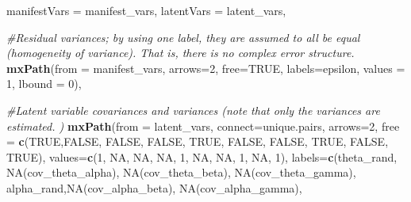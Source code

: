 \documentclass[
12pt, %
twoside,
english]{guelphthesis}
\newenvironment{Shaded}{\begin{snugshade}}{\end{snugshade}}
\newcommand{\AttributeTok}[1]{\textcolor[rgb]{0.13,0.29,0.53}{#1}}
\newcommand{\CommentTok}[1]{\textcolor[rgb]{0.56,0.35,0.01}{\textit{#1}}}
\newcommand{\ConstantTok}[1]{\textcolor[rgb]{0.56,0.35,0.01}{#1}}
\newcommand{\DecValTok}[1]{\textcolor[rgb]{0.00,0.00,0.81}{#1}}
\newcommand{\FunctionTok}[1]{\textcolor[rgb]{0.13,0.29,0.53}{\textbf{#1}}}
\newcommand{\NormalTok}[1]{#1}
\newcommand{\StringTok}[1]{\textcolor[rgb]{0.31,0.60,0.02}{#1}}
\begin{document}
\begin{Shaded}
\begin{Highlighting}[numbers=left,,]
  \AttributeTok{manifestVars =}\NormalTok{ manifest\_vars,}
  \AttributeTok{latentVars =}\NormalTok{ latent\_vars,}
  
  \CommentTok{\#Residual variances; by using one label, they are assumed to all be equal (homogeneity of variance). That is, there is no complex error structure. }
  \FunctionTok{mxPath}\NormalTok{(}\AttributeTok{from =}\NormalTok{ manifest\_vars,}
         \AttributeTok{arrows=}\DecValTok{2}\NormalTok{, }\AttributeTok{free=}\ConstantTok{TRUE}\NormalTok{,  }\AttributeTok{labels=}\StringTok{\textquotesingle{}epsilon\textquotesingle{}}\NormalTok{, }\AttributeTok{values =} \DecValTok{1}\NormalTok{, }\AttributeTok{lbound =} \DecValTok{0}\NormalTok{),}
  
  \CommentTok{\#Latent variable covariances and variances (note that only the variances are estimated. )}
  \FunctionTok{mxPath}\NormalTok{(}\AttributeTok{from =}\NormalTok{ latent\_vars,}
         \AttributeTok{connect=}\StringTok{\textquotesingle{}unique.pairs\textquotesingle{}}\NormalTok{, }\AttributeTok{arrows=}\DecValTok{2}\NormalTok{,}
         \AttributeTok{free =} \FunctionTok{c}\NormalTok{(}\ConstantTok{TRUE}\NormalTok{,}\ConstantTok{FALSE}\NormalTok{, }\ConstantTok{FALSE}\NormalTok{, }\ConstantTok{FALSE}\NormalTok{, }
                  \ConstantTok{TRUE}\NormalTok{, }\ConstantTok{FALSE}\NormalTok{, }\ConstantTok{FALSE}\NormalTok{, }
                  \ConstantTok{TRUE}\NormalTok{, }\ConstantTok{FALSE}\NormalTok{, }
                  \ConstantTok{TRUE}\NormalTok{), }
         \AttributeTok{values=}\FunctionTok{c}\NormalTok{(}\DecValTok{1}\NormalTok{, }\ConstantTok{NA}\NormalTok{, }\ConstantTok{NA}\NormalTok{, }\ConstantTok{NA}\NormalTok{, }
                  \DecValTok{1}\NormalTok{, }\ConstantTok{NA}\NormalTok{, }\ConstantTok{NA}\NormalTok{, }
                  \DecValTok{1}\NormalTok{, }\ConstantTok{NA}\NormalTok{,}
                  \DecValTok{1}\NormalTok{),}
         \AttributeTok{labels=}\FunctionTok{c}\NormalTok{(}\StringTok{\textquotesingle{}theta\_rand\textquotesingle{}}\NormalTok{, }\StringTok{\textquotesingle{}NA(cov\_theta\_alpha)\textquotesingle{}}\NormalTok{, }\StringTok{\textquotesingle{}NA(cov\_theta\_beta)\textquotesingle{}}\NormalTok{, }
                  \StringTok{\textquotesingle{}NA(cov\_theta\_gamma)\textquotesingle{}}\NormalTok{,}
                  \StringTok{\textquotesingle{}alpha\_rand\textquotesingle{}}\NormalTok{,}\StringTok{\textquotesingle{}NA(cov\_alpha\_beta)\textquotesingle{}}\NormalTok{, }\StringTok{\textquotesingle{}NA(cov\_alpha\_gamma)\textquotesingle{}}\NormalTok{, }

\end{Highlighting}
\end{Shaded}
\end{document}
